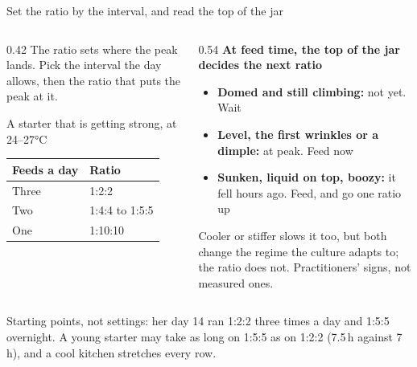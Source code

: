 \documentclass[aspectratio=169,11pt]{beamer}
\begin{document}
\begin{frame}{Set the ratio by the interval, and read the top of the jar}
  \begin{columns}[T]
    \begin{column}{0.42\textwidth}
      \footnotesize
      The ratio sets where the peak lands. Pick the interval the day allows, then the ratio that puts the peak at it.
      \smallskip

      {\scriptsize\color{muted} A starter that is getting strong, at 24--27°C}\par\smallskip
      \begin{tabular}{@{}ll@{}}
        \toprule
        \textbf{Feeds a day} & \textbf{Ratio} \\
        \midrule
        Three & 1:2:2 \\
        Two & 1:4:4 to 1:5:5 \\
        One & 1:10:10 \\
        \bottomrule
      \end{tabular}
    \end{column}
    \begin{column}{0.54\textwidth}
      \footnotesize
      \textbf{\color{crust}At feed time, the top of the jar decides the next ratio}
      \begin{itemize}\setlength{\itemsep}{2pt}
        \item \textbf{Domed and still climbing:} not yet. Wait
        \item \textbf{Level, the first wrinkles or a dimple:} at peak. Feed now
        \item \textbf{Sunken, liquid on top, boozy:} it fell hours ago. Feed, and go one ratio up
      \end{itemize}
      \smallskip
      {\scriptsize Cooler or stiffer slows it too, but both change the regime the culture adapts to; the ratio does not. Practitioners' signs, not measured ones.}
    \end{column}
  \end{columns}
  {\scriptsize Starting points, not settings: her day 14 ran 1:2:2 three times a day and 1:5:5 overnight. A young starter may take as long on 1:5:5 as on 1:2:2 (7.5\,h against 7\,h), and a cool kitchen stretches every row.\par}
\end{frame}
\end{document}
